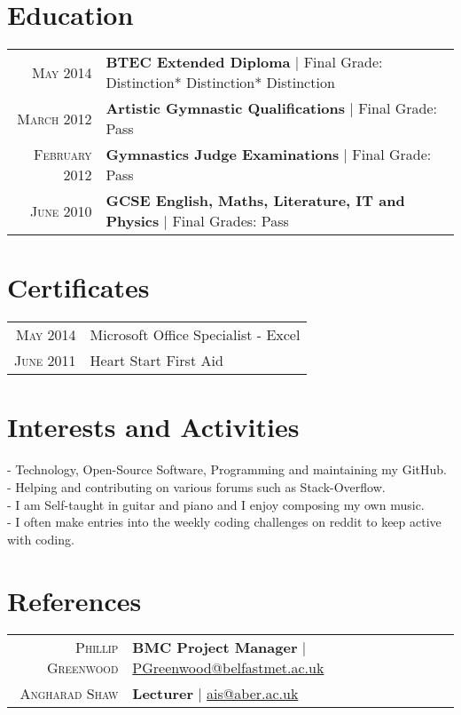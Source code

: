 \documentclass[a4paper,10pt]{article}
\begin{document}
\section{Education}
\begin{tabular}{rl}	
\textsc{May} 2014& \textbf{BTEC Extended Diploma} | Final Grade: Distinction* Distinction* Distinction
\\
\textsc{March} 2012& \textbf{Artistic Gymnastic Qualifications} | Final Grade: Pass
\\
\textsc{February} 2012& \textbf{Gymnastics Judge Examinations} | Final Grade: Pass
\\
\textsc{June} 2010& \textbf{GCSE English, Maths, Literature, IT and Physics} | Final Grades: Pass
\end{tabular}


\section{Certificates}
\begin{tabular}{rl}
 \textsc{May} 2014 & Microsoft Office Specialist - Excel\\
\textsc{June} 2011 & Heart Start First Aid \\
\end{tabular}


\section{Interests and Activities}
- Technology, Open-Source Software, Programming and 
maintaining my GitHub.\\
- Helping and contributing on various forums such as Stack-Overflow.\\
- I am Self-taught in guitar and piano and I enjoy composing my own music.\\
- I often make entries into the weekly coding challenges on reddit to keep active with coding.

\section{References}
\begin{tabular}{rl}	
\textsc{Phillip Greenwood} & \textbf{BMC Project Manager} | \href{mailto:PGreenwood@belfastmet.ac.uk}{PGreenwood@belfastmet.ac.uk}
\\
\textsc{Angharad Shaw} & \textbf{Lecturer} | \href{ais@aber.ac.uk}{ais@aber.ac.uk}

\end{tabular}



\end{document}

